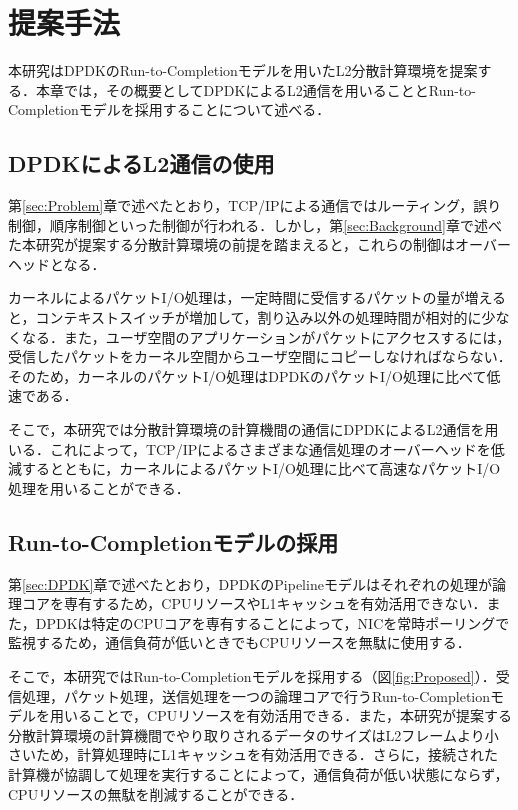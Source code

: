 \section{提案手法}
\label{sec:Proposed}
本研究はDPDKのRun-to-Completionモデルを用いたL2分散計算環境を提案する．本章では，その概要としてDPDKによるL2通信を用いることとRun-to-Completionモデルを採用することについて述べる．

\subsection{DPDKによるL2通信の使用}
第\ref{sec:Problem}章で述べたとおり，TCP/IPによる通信ではルーティング，誤り制御，順序制御といった制御が行われる．しかし，第\ref{sec:Background}章で述べた本研究が提案する分散計算環境の前提を踏まえると，これらの制御はオーバーヘッドとなる．

カーネルによるパケットI/O処理は，一定時間に受信するパケットの量が増えると，コンテキストスイッチが増加して，割り込み以外の処理時間が相対的に少なくなる．また，ユーザ空間のアプリケーションがパケットにアクセスするには，受信したパケットをカーネル空間からユーザ空間にコピーしなければならない．そのため，カーネルのパケットI/O処理はDPDKのパケットI/O処理に比べて低速である．

そこで，本研究では分散計算環境の計算機間の通信にDPDKによるL2通信を用いる．これによって，TCP/IPによるさまざまな通信処理のオーバーヘッドを低減するとともに，カーネルによるパケットI/O処理に比べて高速なパケットI/O処理を用いることができる．

\subsection{Run-to-Completionモデルの採用}
第\ref{sec:DPDK}章で述べたとおり，DPDKのPipelineモデルはそれぞれの処理が論理コアを専有するため，CPUリソースやL1キャッシュを有効活用できない．また，DPDKは特定のCPUコアを専有することによって，NICを常時ポーリングで監視するため，通信負荷が低いときでもCPUリソースを無駄に使用する．

そこで，本研究ではRun-to-Completionモデルを採用する（図\ref{fig:Proposed}）．受信処理，パケット処理，送信処理を一つの論理コアで行うRun-to-Completionモデルを用いることで，CPUリソースを有効活用できる．また，本研究が提案する分散計算環境の計算機間でやり取りされるデータのサイズはL2フレームより小さいため，計算処理時にL1キャッシュを有効活用できる．さらに，接続された計算機が協調して処理を実行することによって，通信負荷が低い状態にならず，CPUリソースの無駄を削減することができる．

